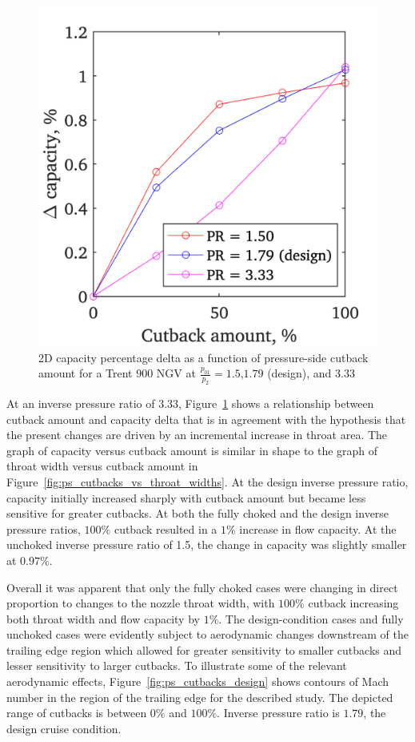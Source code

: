 \documentclass[a4paper, 11pt, oneside]{report}
\begin{document}
\begin{figure}[H]
	\centering
	\includegraphics[width=.45\textwidth]{figs/ps_cutbacks_vs_capacities.png}
	\caption{2D capacity percentage delta as a function of pressure-side cutback amount for a Trent 900 NGV at $\frac{p_{01}}{p_2}=1.5$,$1.79$ (design), and $3.33$}
    \label{fig:ps_cutbacks_vs_capacities}
\end{figure}

At an inverse pressure ratio of 3.33, Figure~\ref{fig:ps_cutbacks_vs_capacities} shows a relationship between cutback amount and capacity delta that is in agreement with the hypothesis that the present changes are driven by an incremental increase in throat area. The graph of capacity versus cutback amount is similar in shape to the graph of throat width versus cutback amount in Figure~\ref{fig:ps_cutbacks_vs_throat_widths}. At the design inverse pressure ratio, capacity initially increased sharply with cutback amount but became less sensitive for greater cutbacks. At both the fully choked and the design inverse pressure ratios, $100\%$ cutback resulted in a $1\%$ increase in flow capacity. At the unchoked inverse pressure ratio of 1.5, the change in capacity was slightly smaller at $0.97\%$. 

Overall it was apparent that only the fully choked cases were changing in direct proportion to changes to the nozzle throat width, with $100\%$ cutback increasing both throat width and flow capacity by $1\%$. The design-condition cases and fully unchoked cases were evidently subject to aerodynamic changes downstream of the trailing edge region which allowed for greater sensitivity to smaller cutbacks and lesser sensitivity to larger cutbacks. To illustrate some of the relevant aerodynamic effects, Figure~\ref{fig:ps_cutbacks_design} shows contours of Mach number in the region of the trailing edge for the described study. The depicted range of cutbacks is between $0\%$ and $100\%$. Inverse pressure ratio is $1.79$, the design cruise condition.
\end{document}
